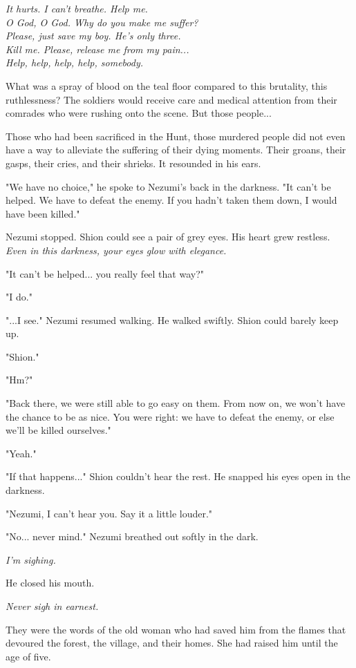 \myspace

\emph{It hurts. I can't breathe. Help me.\\
	O God, O God. Why do you make me suffer?\\
	Please, just save my boy. He's only three.\\
	Kill me. Please, release me from my pain...\\
	Help, help, help, help, somebody.}

\myspace

What was a spray of blood on the teal floor compared to this brutality,
this ruthlessness? The soldiers would receive care and medical attention
from their comrades who were rushing onto the scene. But those people...

Those who had been sacrificed in the Hunt, those murdered people did not
even have a way to alleviate the suffering of their dying moments. Their
groans, their gasps, their cries, and their shrieks. It resounded in his
ears.

"We have no choice," he spoke to Nezumi's back in the darkness. "It
can't be helped. We have to defeat the enemy. If you hadn't taken them
down, I would have been killed."

Nezumi stopped. Shion could see a pair of grey eyes. His heart grew
restless. \emph{Even in this darkness, your eyes glow with elegance.}

"It can't be helped... you really feel that way?"

"I do."

"...I see." Nezumi resumed walking. He walked swiftly. Shion could
barely keep up.

"Shion."

"Hm?"

"Back there, we were still able to go easy on them. From now on, we
won't have the chance to be as nice. You were right: we have to defeat
the enemy, or else we'll be killed ourselves."

"Yeah."

"If that happens..." Shion couldn't hear the rest. He snapped his eyes
open in the darkness.

"Nezumi, I can't hear you. Say it a little louder."

"No... never mind." Nezumi breathed out softly in the dark.

\emph{I'm sighing.}

He closed his mouth.

\emph{Never sigh in earnest.}

They were the words of the old woman who had saved him from the flames
that devoured the forest, the village, and their homes. She had raised
him until the age of five.

